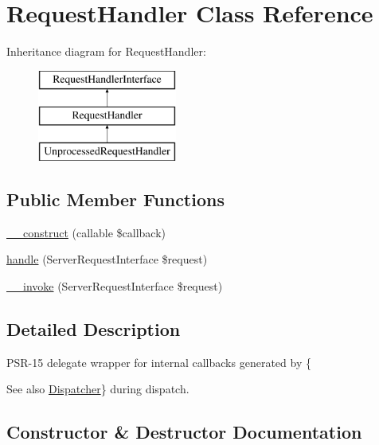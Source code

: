 \hypertarget{class_pes_1_1_middleware_1_1_request_handler}{}\section{Request\+Handler Class Reference}
\label{class_pes_1_1_middleware_1_1_request_handler}
Inheritance diagram for Request\+Handler\+:\begin{figure}[H]
\begin{center}
\leavevmode
\includegraphics[height=3.000000cm]{class_pes_1_1_middleware_1_1_request_handler}
\end{center}
\end{figure}
\subsection*{Public Member Functions}
\begin{DoxyCompactItemize}
\item 
\mbox{\hyperlink{class_pes_1_1_middleware_1_1_request_handler_a450d5eab723e1dd6c448d92b9c75f282}{\+\_\+\+\_\+construct}} (callable \$callback)
\item 
\mbox{\hyperlink{class_pes_1_1_middleware_1_1_request_handler_a426da9efc10c90c1fdee43f2107a7e28}{handle}} (Server\+Request\+Interface \$request)
\item 
\mbox{\hyperlink{class_pes_1_1_middleware_1_1_request_handler_aeabd5c244eb0279b90bac4efacc0b012}{\+\_\+\+\_\+invoke}} (Server\+Request\+Interface \$request)
\end{DoxyCompactItemize}


\subsection{Detailed Description}
P\+S\+R-\/15 delegate wrapper for internal callbacks generated by \{\begin{DoxySeeAlso}{See also}
\mbox{\hyperlink{class_pes_1_1_middleware_1_1_dispatcher}{Dispatcher}}\} during dispatch. 
\end{DoxySeeAlso}


\subsection{Constructor \& Destructor Documentation}
\mbox{\label{class_pes_1_1_middleware_1_1_request_handler_a450d5eab723e1dd6c448d92b9c75f282}} 
